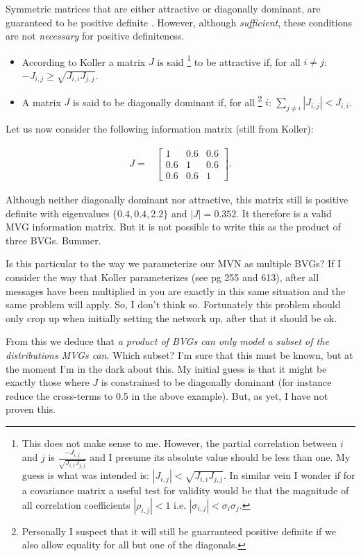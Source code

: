 Symmetric matrices that are either attractive or diagonally dominant,
are guaranteed to be positive definite \cite[p 256]{Koller2009}. However,
although \emph{sufficient}, these conditions are not \emph{necessary}
for positive definiteness.
\begin{itemize}
\item According to Koller a matrix $J$ is said%
\footnote{This does not make sense to me. However, the partial correlation between
$i$ and $j$ is $\frac{-J_{i,j}}{\sqrt{J_{i,i}J_{j,j}}}$ and I presume
its absolute value should be less than one. My guess is what was intended
is: $|J_{i,j}|<\sqrt{J_{i,i}J_{j,j}}$. In similar vein I wonder if
for a covariance matrix a useful test for validity would be that the
magnitude of all correlation coefficients $|\rho_{i,j}|<1$ i.e. $|\sigma_{i,j}|<\sigma_{i}\sigma_{j}$.%
} to be attractive if, for all $i\neq j$: $-J_{i,j}\geq\sqrt{J_{i,i}J_{j,j}}$.
\item A matrix $J$ is said to be diagonally dominant if, for all%
\footnote{Personally I suspect that it will still be guarranteed positive definite
if we also allow equality for all but one of the diagonals.%
} $i$: $\sum_{j\neq i}|J_{i,j}|<J_{i,i}$.
\end{itemize}
Let us now consider the following information matrix (still from Koller):

\begin{align*}
J= & \left[\begin{array}{ccc}
1 & 0.6 & 0.6\\
0.6 & 1 & 0.6\\
0.6 & 0.6 & 1
\end{array}\right].
\end{align*}


Although neither diagonally dominant nor attractive, this matrix still
is positive definite with eigenvalues $\{0.4,0.4,2.2\}$ and $|J|=0.352$.
It therefore is a valid MVG information matrix. But it is not possible
to write this as the product of three BVGs. Bummer.

Is this particular to the way we parameterize our MVN as multiple
BVGs? If I consider the way that Koller parameterizes (see pg 255
and 613), after all messages have been multiplied in you are exactly
in this same situation and the same problem will apply. So, I don't
think so. Fortunately this problem should only crop up when initially
setting the network up, after that it should be ok.

From this we deduce that \emph{a product of BVGs can only model a
subset of the distributions MVGs can}. Which subset? I'm sure that
this must be known, but at the moment I'm in the dark about this.
My initial guess is that it might be exactly those where $J$ is constrained
to be diagonally dominant (for instance reduce the cross-terms to
0.5 in the above example). But, as yet, I have not proven this.

